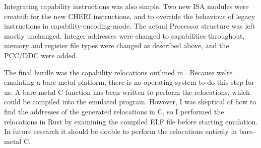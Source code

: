 
Integrating capability instructions was also simple.
Two new ISA modules were created:  for the new CHERI instructions, and  to override the behaviour of legacy instructions in capability-encoding-mode.
The actual Processor structure was left mostly unchanged.
Integer addresses were changed to capabilities throughout,
memory and register file types were changed as described above, and the PCC/DDC were added.

The final hurdle was the capability relocations outlined in .
Because we're emulating a bare-metal platform, there is no operating system to do this step for us.
A bare-metal C function has been written to perform the relocations, which could be compiled into the emulated program.
However, I was skeptical of how to find the addresses of the generated relocations in C, so I performed the relocations in Rust by examining the compiled ELF file before starting emulation.
In future research it should be doable to perform the relocations entirely in bare-metal C.

